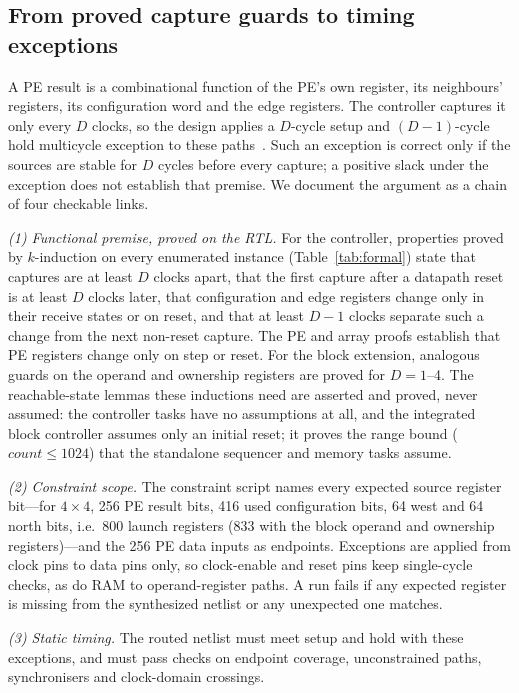 \subsection{From proved capture guards to timing exceptions}
\label{sec:chain}

A PE result is a combinational function of the PE's own register, its
neighbours' registers, its configuration word and the edge registers. The
controller captures it only every $D$ clocks, so the design applies a
$D$-cycle setup and $(D-1)$-cycle hold multicycle exception to these
paths~\cite{ug903,bhasker-timing}. Such an exception is correct only if the
sources are stable for $D$ cycles before every capture; a positive slack
under the exception does not establish that premise. We document the
argument as a chain of four checkable links.

\emph{(1) Functional premise, proved on the RTL.} For the controller,
properties proved by $k$-induction on every enumerated instance
(Table~\ref{tab:formal}) state that captures are at least $D$ clocks apart,
that the first capture after a datapath reset is at least $D$ clocks later,
that configuration and edge registers change only in their receive states
or on reset, and that at least $D-1$ clocks separate such a change from the
next non-reset capture. The PE and array proofs establish that PE registers
change only on step or reset. For the block extension, analogous guards on
the operand and ownership registers are proved for $D=1$--4. The
reachable-state lemmas these inductions need are asserted and proved, never
assumed: the controller tasks have no assumptions at all, and the
integrated block controller assumes only an initial reset; it proves the
range bound ($\mathit{count}\le1024$) that the standalone sequencer and
memory tasks assume.

\emph{(2) Constraint scope.} The constraint script names every expected
source register bit---for $4\times4$, 256 PE result bits, 416 used
configuration bits, 64 west and 64 north bits, i.e.\ 800 launch registers
(833 with the block operand and ownership registers)---and the 256 PE data
inputs as endpoints. Exceptions are applied from clock pins to data pins
only, so clock-enable and reset pins keep single-cycle checks, as do RAM to
operand-register paths. A run fails if any expected register is missing
from the synthesized netlist or any unexpected one matches.

\emph{(3) Static timing.} The routed netlist must meet setup and hold with
these exceptions, and must pass checks on endpoint coverage, unconstrained
paths, synchronisers and clock-domain crossings.

